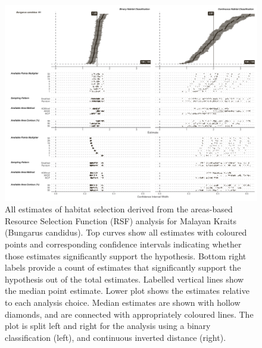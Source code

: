 \documentclass[10pt,a4paper]{article}
\begin{document}
\begin{figure}
\includegraphics[width=1\linewidth]{../../figures/specCurve_Bungarus candidus_rsf} \caption{All estimates of habitat selection derived from the areas-based Resource Selection Function (RSF) analysis for Malayan Kraits (Bungarus candidus). Top curves show all estimates with coloured points and corresponding confidence intervals indicating whether those estimates significantly support the hypothesis. Bottom right labels provide a count of estimates that significantly support the hypothesis out of the total estimates. Labelled vertical lines show the median point estimate. Lower plot shows the estimates relative to each analysis choice. Median estimates are shown with hollow diamonds, and are connected with appropriately coloured lines. The plot is split left and right for the analysis using a binary classification (left), and continuous inverted distance (right).}\label{fig:specCurveRsfBUCA}
\end{figure}
\end{document}
